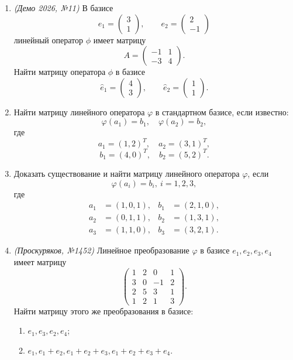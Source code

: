 \begin{enumerate}
    \item \textit{(Демо 2026, №11)}
    В базисе
    \[
    e_1=\begin{pmatrix} 3 \\ 1 \end{pmatrix},\qquad
    e_2=\begin{pmatrix} 2 \\ -1 \end{pmatrix}
    \]
    линейный оператор $\phi$ имеет матрицу
    \[
    A=\begin{pmatrix}
    -1 & 1 \\
    -3 & 4
    \end{pmatrix}.
    \]
    Найти матрицу оператора $\phi$ в базисе
    \[
    \hat e_1=\begin{pmatrix} 4 \\ 3 \end{pmatrix},\qquad
    \hat e_2=\begin{pmatrix} 1 \\ 1 \end{pmatrix}.
    \]

    \item Найти матрицу линейного оператора $\varphi$ в стандартном базисе, если известно:
    \[
    \varphi(a_1)=b_1,\quad \varphi(a_2)=b_2,
    \]
    где
    \[
    a_1=(1,2)^T,\quad a_2=(3,1)^T,
    \]
    \[
    b_1=(4,0)^T,\quad b_2=(5,2)^T.
    \]

    \item Доказать существование и найти матрицу линейного оператора $\varphi$, если
    \[
    \varphi(a_i)=b_i,\ i=1,2,3,
    \]
    где
    \begin{align*}
    a_1 &= (1,0,1), & b_1 &= (2,1,0), \\
    a_2 &= (0,1,1), & b_2 &= (1,3,1), \\
    a_3 &= (1,1,0), & b_3 &= (3,2,1).
    \end{align*}

    \item \textit{(Проскуряков, №1452)} Линейное преобразование $\varphi$ в базисе $e_1, e_2, e_3, e_4$ имеет матрицу
    \[
    \begin{pmatrix}
    1 & 2 &  0 & 1 \\
    3 & 0 & -1 & 2 \\
    2 & 5 &  3 & 1 \\
    1 & 2 &  1 & 3
    \end{pmatrix}.
    \]
    Найти матрицу этого же преобразования в базисе:
    \begin{enumerate}
        \item[а)] $e_1, e_3, e_2, e_4$;
        \item[б)] $e_1, e_1 + e_2, e_1 + e_2 + e_3, e_1 + e_2 + e_3 + e_4$.
    \end{enumerate}


\end{enumerate}
